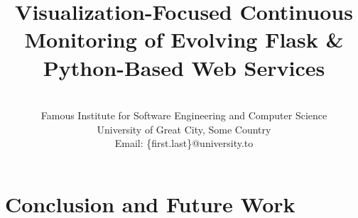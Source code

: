 \documentclass[conference]{IEEEtran}
\begin{document}
	

\title{Visualization-Focused Continuous Monitoring of Evolving Flask \& Python-Based Web Services}

\author{
\\
Famous Institute for Software Engineering and Computer Science\\
University of Great City, Some Country\\
Email: \{first.last\}@university.to 
}


\maketitle



















% 






\section{Conclusion and Future Work}
\label{sec:conclusions}
\end{document}
